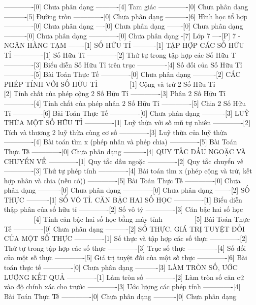 -------------[0] Chưa phân dạng
----------[4] Tam giác
-------------[0] Chưa phân dạng
----------[5] Đường tròn
-------------[0] Chưa phân dạng
----------[6] Hình học tổ hợp
-------------[0] Chưa phân dạng
----[0] Chưa phân dạng
-------[0] Chưa phân dạng
----------[0] Chưa phân dạng
-------------[0] Chưa phân dạng
-[7] Lớp 7
----[P] 7 - NGÂN HÀNG TẠM
-------[1] SỐ HỮU TỈ
----------[1] TẬP HỢP CÁC SỐ HỮU TỈ 
-------------[1] Số Hữu Tỉ
-------------[2] Thứ tự trong tập hợp các Số Hữu T
-------------[3] Biểu diễn Số Hữu Tỉ trên trục
-------------[4] Số đối của Số Hữu Tỉ
-------------[5] Bài Toán Thực Tế
-------------[0] Chưa phân dạng
----------[2] CÁC PHÉP TÍNH VỚI SỐ HỮU TỈ
-------------[1] Cộng và trừ 2 Số Hữu Tỉ
-------------[2] Tính chất của phép cộng 2 Số Hữu Tỉ
-------------[3] Phân 2 Số Hữu Tỉ
-------------[4] Tính chất của phép nhân 2 Số Hữu Tỉ
-------------[5] Chia 2 Số Hữu Tỉ
-------------[6] Bài Toán Thực Tế
-------------[0] Chưa phân dạng
----------[3] LUỸ THỪA MỘT SỐ HỮU TỈ
-------------[1] Luỹ thừa với số mũ tự nhiên
-------------[2] Tích và thương 2 luỹ thừa cùng cơ số
-------------[3] Luỹ thừa của luỹ thừa
-------------[4] Bài toán tìm x (phép nhân và phép chia)
-------------[5] Bài Toán Thực Tế
-------------[0] Chưa phân dạng
----------[4] QUY TẮC DẤU NGOẶC VÀ CHUYỂN VẾ
-------------[1] Quy tắc dấu ngoặc
-------------[2] Quy tắc chuyển vế
-------------[3] Thứ tự phép tính
-------------[4] Bài toán tìm x (phép cộng và trừ, kết hợp nhân và chia (nếu có))
-------------[5] Bài Toán Thực Tế
-------------[0] Chưa phân dạng
----------[0] Chưa phân dạng
-------------[0] Chưa phân dạng
-------[2] SỐ THỰC
----------[1] SỐ VÔ TỈ. CĂN BẬC HAI SỐ HỌC
-------------[1] Biểu diễn thập phân của số hữu tỉ
-------------[2] Số vô tỷ
-------------[3] Căn bậc hai số học
-------------[4] Tính căn bậc hai số học bằng máy tính
-------------[5] Bài Toán Thực Tế
-------------[0] Chưa phân dạng
----------[2] SỐ THỰC. GIÁ TRỊ TUYỆT ĐỐI CỦA MỘT SỐ THỰC
-------------[1] Số thực và tập hợp các số thực
-------------[2] Thứ tự trong tập hợp các số thực
-------------[3] Trục số thực
-------------[4] Số đối của một số thực
-------------[5] Giá trị tuyệt đối của một số thực
-------------[6] Bài toán thực tế
-------------[0] Chưa phân dạng
----------[3] LÀM TRÒN SỐ, ƯỚC LƯỢNG KẾT QUẢ
-------------[1] Làm tròn số
-------------[2] Làm tròn số căn cứ vào độ chính xác cho trước
-------------[3] Ước lượng các phép tính
-------------[4] Bài Toán Thực Tế
-------------[0] Chưa phân dạng
----------[0] Chưa phân dạng
